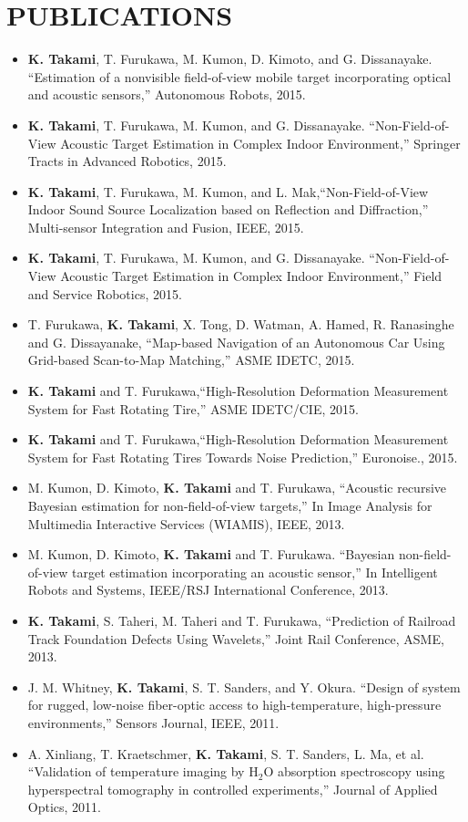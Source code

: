 \documentclass[11pt,letter]{article}
\begin{document}
\section*{PUBLICATIONS}
\begin{tabbing}

\end{tabbing}
\begin{itemize}
		\item {\bf K. Takami}, T. Furukawa, M. Kumon, D. Kimoto, and G. Dissanayake. ``Estimation of a nonvisible field-of-view mobile target incorporating optical and acoustic sensors,'' Autonomous Robots, 2015.
	\item {\bf K. Takami}, T. Furukawa, M. Kumon, and G. Dissanayake. ``Non-Field-of-View Acoustic Target Estimation in Complex Indoor Environment,'' Springer Tracts in Advanced Robotics, 2015.
	\item  {\bf K. Takami}, T. Furukawa, M. Kumon, and L. Mak,``Non-Field-of-View Indoor Sound Source Localization based on Reflection and Diffraction,'' Multi-sensor Integration and Fusion, IEEE, 2015.
	\item {\bf K. Takami}, T. Furukawa, M. Kumon, and G. Dissanayake. ``Non-Field-of-View Acoustic Target Estimation in Complex Indoor Environment,'' Field and Service Robotics, 2015.
	\item  T. Furukawa, {\bf K. Takami}, X. Tong, D. Watman, A. Hamed, R. Ranasinghe and G. Dissayanake, ``Map-based Navigation of an Autonomous Car Using Grid-based Scan-to-Map Matching,'' ASME IDETC, 2015.
	\item  {\bf K. Takami} and T. Furukawa,``High-Resolution Deformation Measurement System for Fast Rotating Tire,'' ASME IDETC/CIE, 2015.
	\item  {\bf K. Takami} and T. Furukawa,``High-Resolution Deformation Measurement System for Fast Rotating Tires Towards Noise Prediction,'' Euronoise., 2015.
	\item M. Kumon, D. Kimoto, {\bf K. Takami} and T. Furukawa, ``Acoustic recursive Bayesian estimation for non-field-of-view targets,'' In Image Analysis for Multimedia Interactive Services (WIAMIS), IEEE, 2013.
	\item M. Kumon, D. Kimoto, {\bf K. Takami} and T. Furukawa. ``Bayesian non-field-of-view target estimation incorporating an acoustic sensor,'' In Intelligent Robots and Systems, IEEE/RSJ International Conference, 2013.
	\item {\bf K. Takami}, S. Taheri, M. Taheri and T. Furukawa, ``Prediction of Railroad Track Foundation Defects Using Wavelets,'' Joint Rail Conference, ASME, 2013.
	\item J. M. Whitney, {\bf K. Takami}, S. T. Sanders, and Y. Okura. ``Design of system for rugged, low-noise fiber-optic access to high-temperature, high-pressure environments,'' Sensors Journal, IEEE, 2011.
	\item A. Xinliang, T. Kraetschmer, {\bf K. Takami}, S. T. Sanders, L. Ma, et al. ``Validation of temperature imaging by H$_2$O absorption spectroscopy using hyperspectral tomography in controlled experiments,'' Journal of Applied Optics, 2011.
\end{itemize}
\end{document}
